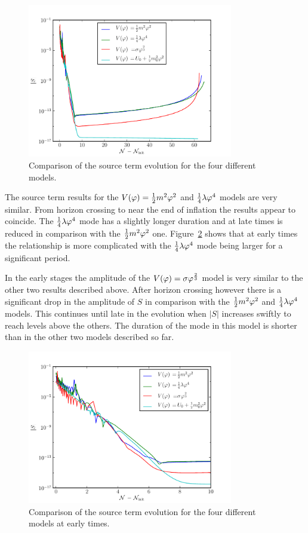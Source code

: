\begin{figure}
 \centering
 \includegraphics[width=0.8\textwidth]{numerical/graphs/cmp_src_kwmap-large}
 \caption[Comparison of source term for models]{Comparison of the source term
evolution for the four different models.}
\label{fig:cmp-src-kwmap}
\end{figure}
% 

The source term results for the $V(\varphi)=\frac{1}{2} m^2 \varphi^2$ and $\frac{1}{4}\lambda\varphi^4$ models are very similar.
From horizon crossing to near the end of inflation the results appear to coincide.
The $\frac{1}{4}\lambda\varphi^4$ mode has a slightly longer duration and at late times is reduced in comparison
with the $\frac{1}{2} m^2 \varphi^2$ one. Figure~\ref{fig:cmp-src-zoom-kwmap} shows that at early times the
relationship is more complicated with the $\frac{1}{4}\lambda\varphi^4$ mode being larger for a significant
period.

In the early stages the amplitude of the $V(\varphi)=\sigma\varphi^{\frac{2}{3}}$ model is very
similar to the other two
results described above. After horizon crossing however there is a significant drop in the
amplitude of $S$ in comparison with the $\frac{1}{2} m^2 \varphi^2$ and $\frac{1}{4}\lambda\varphi^4$ models. This
continues
until late in the evolution when $|S|$ increases swiftly to reach levels above the
others.
The duration of the mode in this model is shorter than in the other two models
described so far. 

\begin{figure}
 \centering
 \includegraphics[width=0.8\textwidth]{numerical/graphs/cmp_src_kwmap_zoom-large}
 \caption[Comparison of source term for models at early stage]{Comparison of the
source term evolution for the four different models at early times.}
\label{fig:cmp-src-zoom-kwmap}
\end{figure}
% 

